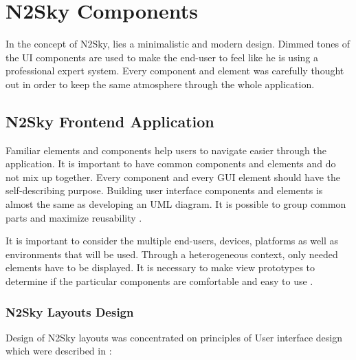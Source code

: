 \section{N2Sky Components}\label{N2Sky Components}

In the concept of N2Sky, lies a minimalistic and modern design. Dimmed tones of the UI components are used to make the end-user to feel like he is using a professional expert system. Every component and element was carefully thought out in order to keep the same atmosphere through the whole application. 

\subsection{N2Sky Frontend Application}\label{N2Sky Frontend Application}


Familiar elements and components help users to navigate easier through the application. It is important to have common components and elements and do not mix up together. Every component and every GUI element should have the self-describing purpose. Building user interface components and elements is almost the same as developing an UML diagram. It is possible to group common parts and maximize reusability \cite{mod_ui_book}. 

It is important to consider the multiple end-users, devices, platforms as well as environments that will be used. Through a heterogeneous context, only needed elements have to be displayed. It is necessary to make view prototypes to determine if the particular components are comfortable and easy to use \cite{Martinez2017}. 

\subsubsection{N2Sky Layouts Design}\label{N2Sky Layouts Design}


Design of N2Sky layouts was concentrated on principles of User interface design which were described in \cite{gui_layout}: 

